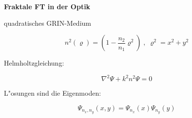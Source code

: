 \documentclass[11pt]{article}
\begin{document}
\newpage
\centerline{\bf \Huge Fraktale FT in der Optik} 
\vfill
\centerline{quadratisches GRIN-Medium} 
$$ n^2\left( \varrho \right) = \left( 1-\frac{n_2}{n_1} \varrho^2 \right) \; , \; \varrho^2 = x^2 + y^2 $$
\vfill
\centerline{Helmholtzgleichung:}
$$\nabla^2 \Psi + k^2n^2 \Psi = 0 $$ 
\vfill
\centerline{L"osungen sind die Eigenmoden:} 
$$\Psi_{n_x , n_y} \left( x,y \right) = \Psi_{n_x}\left( x \right) \Psi_{n_y}\left( y \right) $$ 
\vfill
\end{document}
